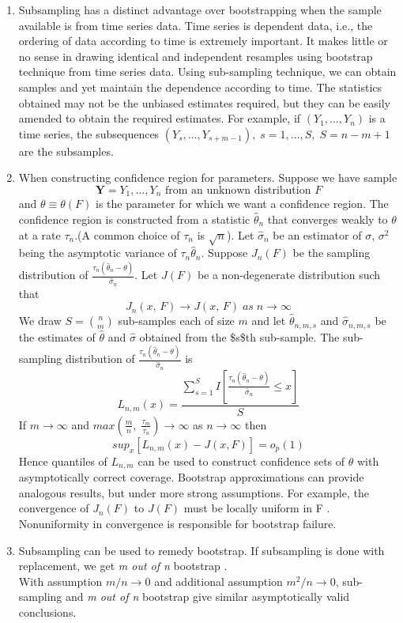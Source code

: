 \documentclass[11pt]{article}
\begin{document}
\begin{enumerate}
\item Subsampling has a distinct advantage over bootstrapping when the
   sample available is from time series data. Time series is dependent
   data, i.e., the ordering of data according to time is extremely
   important. It makes little or no sense in drawing identical and
   independent resamples using bootstrap technique from time series
   data. Using sub-sampling technique, we can obtain samples and yet
   maintain the dependence according to time. The statistics obtained
   may not be the unbiased estimates required, but they can be easily
   amended to obtain the required estimates. For example, if $(Y_1, \ldots, Y_n)$ is a time series, the subsequences $(Y_s, \ldots, Y_{s+m-1}), \; s = 1, \ldots, S,\; S = n-m+1$ are the subsamples.
\item When constructing confidence region for parameters. Suppose we have
   sample $$\mathbf{Y} = Y_1, \ldots, Y_n \mbox{ from an unknown
   distribution } F$$ and $\theta \equiv \theta(F)$ is the parameter
   for which we want a confidence region. The confidence region is
   constructed from a statistic $\hat{\theta}_n$ that converges weakly
   to $\theta$ at a rate $\tau_n$.(A common choice of $\tau_n$ is
   $\sqrt{n}$). Let $\hat{\sigma}_n$ be an estimator of $\sigma$,
   $\sigma^2$ being the asymptotic variance of $\tau_n\hat{\theta}_n$.
   Suppose $J_n(F)$ be the sampling distribution of
   $\frac{\tau_n(\hat{\theta}_n - \theta)}{\hat{\sigma}_n}$. Let
   $J(F)$ be  a non-degenerate distribution such that $$J_n(x,\, F)
   \rightarrow J(x,\, F)\; as \; n \rightarrow \infty$$ We draw $S =
   {n \choose m}$ sub-samples each of size $m$ and let
   $\hat{\theta}_{n,m,s}$ and $\hat{\sigma}_{n,m,s}$ be the estimates
   of $\hat{\theta}$ and $\hat{\sigma}$ obtained from the \$s\$th
   sub-sample. The sub-sampling distribution of
   $\frac{\tau_n(\hat{\theta}_n - \theta)}{\hat{\sigma}_n}$ is
   $$L_{n,m}(x) = \frac{\sum^S_{s=1}I[\frac{\tau_n(\hat{\theta}_n -
   \theta)}{\hat{\sigma}_n}\leq x]}{S}$$ If $m \rightarrow \infty$ and
   $max(\frac{m}{n},\; \frac{\tau_m}{\tau_n}) \rightarrow \infty$ as
   $n \rightarrow \infty$ then $$sup_x[L_{n,m}(x) - J(x, F)] =
   o_p(1)$$ Hence quantiles of $L_{n,m}$ can be used to construct
   confidence sets of $\theta$ with asymptotically correct coverage. Bootstrap approximations can provide analogous results, but under more strong assumptions. For example, the convergence of $J_n(F)$ to $J(F)$ must be locally uniform in F . Nonuniformity in convergence is responsible for bootstrap failure.\\
\item Subsampling can be used to remedy bootstrap. If subsampling is done with replacement, we get \textit{m out of n} bootstrap .\\ With assumption $m/n \rightarrow 0$ and additional assumption $m^2/n \rightarrow 0$, sub-sampling and \textit{m out of n} bootstrap give similar asymptotically valid conclusions.\\
\end{enumerate}
 
\end{document}
